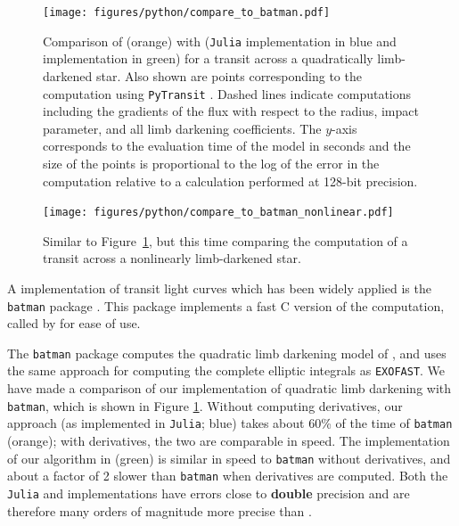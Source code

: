 \documentclass[modern,trackchanges]{aastex63}
\begin{document}
\begin{figure}[p!]
    \begin{centering}
    \texttt{[image: figures/python/compare\_to\_batman.pdf]}
    \caption{Comparison of \citet{Kreidberg2015} (orange) with \thiswork
             (\texttt{Julia} implementation in blue and \starry implementation
             in green) for a transit across a quadratically limb-darkened star.
             Also shown are points corresponding to the computation using
             \texttt{PyTransit} \citep{Parviainen2015b}. Dashed lines indicate
             computations including the gradients of the flux with respect to
             the radius, impact parameter, and all limb darkening coefficients.
             The $y$-axis corresponds to the evaluation time of the model in
             seconds and the size of the points is proportional to the log of
             the error in the computation relative to a calculation performed
             at 128-bit precision.
    \label{fig:batman_comparison}}
    \end{centering}
\end{figure}

\begin{figure}[p!]
    \begin{centering}
    \texttt{[image: figures/python/compare\_to\_batman\_nonlinear.pdf]}
    \caption{Similar to Figure~\ref{fig:batman_comparison}, but this time comparing
             the computation of a transit across a nonlinearly limb-darkened star.
    \label{fig:batman_nonlinear_comparison}}
    \end{centering}
\end{figure}

A \Python implementation of transit light curves which has been widely applied
is the \texttt{batman} package \citep{Kreidberg2015}.  This package
implements a fast C version of the computation, called by \Python for
ease of use.

The \texttt{batman} package computes the quadratic limb darkening model
of \citet{MandelAgol2002}, and uses the same approach for computing
the complete elliptic integrals as \texttt{EXOFAST}.  We have made a comparison
of our implementation of quadratic limb darkening with \texttt{batman},
which is shown in Figure \ref{fig:batman_comparison}.  Without computing
derivatives, our approach (as implemented in \texttt{Julia}; blue)
takes about 60\% of the time of \texttt{batman} (orange);
with derivatives, the two are comparable in speed. The implementation
of our algorithm in \starry (green) is similar in speed to \texttt{batman}
without derivatives, and about a factor of 2 slower than \texttt{batman}
when derivatives are computed. Both the \texttt{Julia} and \starry
implementations have errors close to {\bf double} precision and are therefore
many orders of magnitude more precise than \batman.
\end{document}

